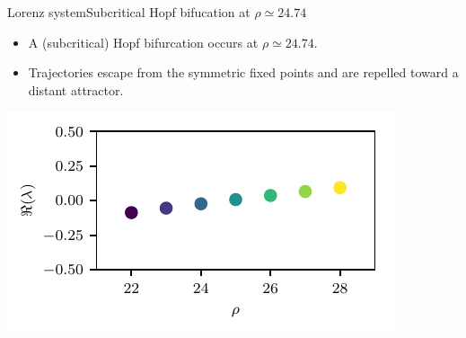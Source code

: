 \documentclass[usenames,dvipsnames,svgnames,10pt,aspectratio=169]{beamer}
\begin{document}
\begin{frame}[t, c]{Lorenz system}{Subcritical Hopf bifucation at $\rho \simeq 24.74$}
	\begin{minipage}{.48\textwidth}
		\begin{itemize}
			\item A (subcritical) Hopf bifurcation occurs at $\rho \simeq 24.74$.

			\bigskip

			\item Trajectories escape from the symmetric fixed points and are repelled toward a distant attractor.
		\end{itemize}
	\end{minipage}%
	\hfill
	\begin{minipage}{.48\textwidth}
		\centering
		\includegraphics[width=.9\textwidth]{hopf_bifurcation_eigenvalue}
	\end{minipage}

	\vspace{1cm}
\end{frame}
\end{document}
